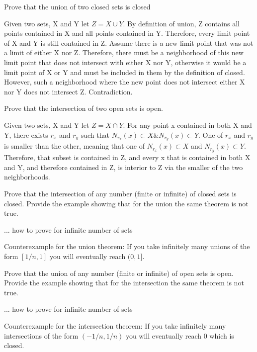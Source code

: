 \documentclass[12pt]{article}
\newenvironment{exercise}[2][Exercise]{\begin{trivlist}
\item[\hskip \labelsep {\bfseries #1}\hskip \labelsep {\bfseries #2.}]}{\end{trivlist}}
\begin{document}
\begin{exercise}{2.4}
 Prove that the union of two closed sets is closed
\end{exercise}
Given two sets, X and Y let $Z = X \cup Y$. By definition of union, Z contains all points contained in X and all points contained in Y. Therefore, every limit point of X and Y is still contained in Z. Assume there is a new limit point that was not a limit of either X nor Z. Therefore, there must be a neighborhood of this new limit point that does not intersect with either X nor Y, otherwise it would be a limit point of X or Y and must be included in them by the definition of closed. However, such a neighborhood where the new point does not intersect either X nor Y does not intersect Z. Contradiction.
\begin{exercise}{2.5}
Prove that the intersection of two open sets is open.
\end{exercise}
Given two sets, X and Y let $Z = X \cap Y$. For any point x contained in both X and Y, there exists $r_x$ and $r_y$ such that $N_{r_x}(x) \subset X \& N_{r_y}(x) \subset Y$. One of $r_x$ and $r_y$ is smaller than the other, meaning that one of $N_{r_x}(x) \subset X$ and $N_{r_y}(x) \subset Y$. Therefore, that subset is contained in Z, and every x that is contained in both X and Y, and therefore contained in Z, is interior to Z via the smaller of the two neighborhoods.

\begin{exercise}{2.6}
Prove that the intersection of any number (finite or infinite) of closed sets is closed. Provide the example showing that for the union the same theorem is not true.
\end{exercise}

... how to prove for infinite number of sets

Counterexample for the union theorem: If you take infinitely many unions of the form $[1/n, 1]$ you will eventually reach $(0, 1]$.

\begin{exercise}{2.7}
Prove that the union of any number (finite or infinite) of open sets is open. Provide the example showing that for the intersection the same theorem is not true.
\end{exercise}

... how to prove for infinite number of sets

Counterexample for the intersection theorem: If you take infinitely many intersections of the form $(-1/n, 1/n)$ you will eventually reach ${0}$ which is closed.

 
\end{document}
